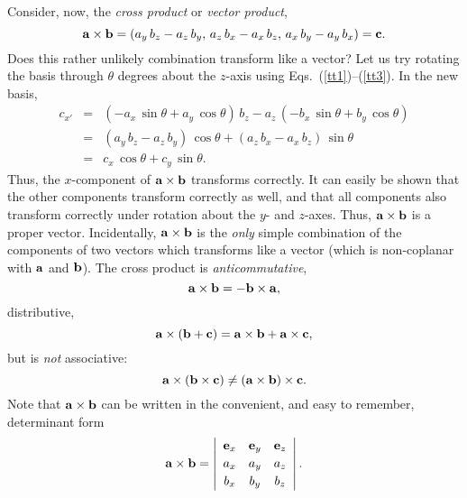 Consider, now, the {\em cross product} or {\em vector product},
\begin{equation}
{\bf a}\times{\bf b} = (a_y \, b_z-a_z\, b_y,\, a_z\, b_x - a_x\, b_z,\, a_x\, b_y - a_y\, b_x)
={\bf c}.
\end{equation}
Does this rather unlikely combination transform like a vector? Let us try
rotating the basis through $\theta$ degrees about the $z$-axis using Eqs.~(\ref{tt1})--(\ref{tt3}).
In the new basis,
\begin{eqnarray}
c_{x'} &= &(-a_x\, \sin\theta + a_y\,\cos\theta)\,b_z - a_z\,(-b_x\, \sin\theta + b_y\,\cos\theta)
\nonumber\\[0.5ex]
&=& (a_y\, b_z - a_z\, b_y)\, \cos\theta + (a_z\, b_x-a_x\, b_z)\,\sin\theta\nonumber\\[0.5ex]
& =& c_x\,\cos\theta
+c_y\,\sin\theta.
\end{eqnarray}
Thus, the $x$-component of ${\bf a}\times{\bf b}$ transforms correctly. It can
easily  be shown that the other components transform correctly as well, and that
all components also transform correctly under rotation about the $y$- and $z$-axes. 
Thus, ${\bf a}\times {\bf b}$ is a proper vector. Incidentally, ${\bf a}\times {\bf b}$
is the {\em only}\/ simple combination of the components of two vectors which transforms
like a vector (which is non-coplanar with ${\bf a}$ and ${\bf b}$).
 The cross product is 
{\em anticommutative},
\begin{equation}
{\bf a}\times{\bf b} = - {\bf b} \times{\bf a},
\end{equation}
distributive,
\begin{equation}
{\bf a}\times({\bf b} +{\bf c})=  {\bf a} \times{\bf b}+{\bf a}\times{\bf c},
\end{equation}
but is {\em not}\/ associative:
\begin{equation}
{\bf a}\times({\bf b} \times{\bf c})\neq ({\bf a}\times{\bf b}) \times{\bf c}.
\end{equation}
Note that ${\bf a}\times {\bf b}$ can be written in the convenient, and easy
to remember, determinant form
\begin{equation}
{\bf a}\times {\bf b} = \left|\begin{array}{ccc}
{\bf e}_x&{\bf e}_y&{\bf e}_z\\[0.5ex]
a_x& a_y& a_z\\[0.5ex]
b_x & b_y & b_z\end{array}\right|.
\end{equation}

